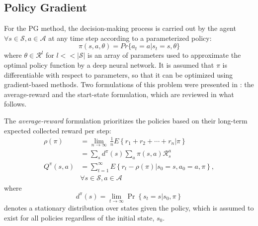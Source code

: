 \documentclass[journal]{IEEEtran}
\begin{document}
\subsection{Policy Gradient}

For the PG method, the decision-making process is carried out by the agent $\forall s\in \mathcal{S}, a \in \mathcal{A}$ at any time step  according to a parameterized policy: 
\begin{equation}
\pi(s,a,\theta)=Pr\{a_t=a|s_t=s, \theta\}
\label{eq3}
\end{equation}
where $\theta \in \mathcal{R}^l$ for $l<<|\mathcal{S}|$ is an array of parameters used to approximate the optimal policy function by a deep neural network. It is assumed that $\pi$ is differentiable with respect to parameters, so that it can be optimized using gradient-based methods. Two formulations of this problem were presented in \cite{sutton2000policy}: the average-reward and the start-state formulation, which are reviewed in what follows.


The \textit{average-reward} formulation prioritizes the policies based on their long-term expected collected reward per step:
\begin{equation}
\begin{aligned} 
 \rho (\pi ) &= \underset{n\to \infty }{\mathop{\lim }}\,\frac{1}{n}E\left\{ {{r}_{1}}+{{r}_{2}}+\cdots +{{r}_{n}}|\pi  \right\} \\  &=
   \sum\limits_{s}{{{d}^{\pi }}(s)\sum\limits_{a}{\pi (s,a)\mathcal{R}_{s}^{a}}}  \\ 
  {{Q}^{\pi }}(s,a) &= \sum\limits_{t=1}^{\infty } E\left\{ {r}_{t} - \rho(\pi)|{{s}_{0}}=s,{{a}_{0}}=a,\pi  \right\}, \\ & \forall s \in \mathcal{S}, a \in \mathcal{A} 
\end{aligned} 
\label{eq4}
\end{equation}
where 
\begin{equation}
{{d}^{\pi }}(s)={{\lim }_{t\to \infty }}\Pr \left\{ {{s}_{t}}=s|{{s}_{0}},\pi  \right\}
\end{equation}
denotes a stationary distribution over states given the policy, which is assumed to exist for all policies regardless of the initial state, $s_0$. 
\end{document}
